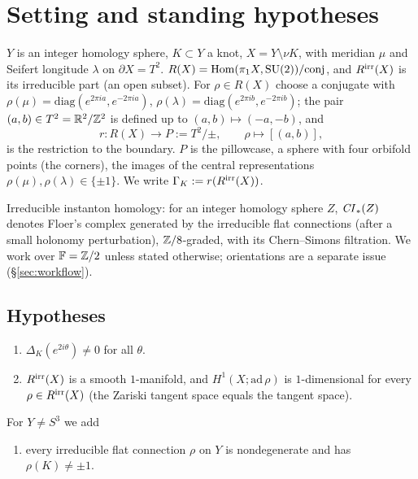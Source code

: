 \section{Setting and standing hypotheses}\label{sec:setting}
$Y$ is an integer homology sphere, $K\subset Y$ a knot, $X=Y\setminus\nu K$, with meridian $\mu$ and
Seifert longitude $\lambda$ on $\partial X=T^2$.  $R(X)=\operatorname{Hom}(\pi_1X,\operatorname{SU}(2))/\mathrm{conj}$, and $R^{\rm irr}(X)$ is
its irreducible part (an open subset).  For $\rho\in R(X)$ choose a conjugate with
$\rho(\mu)=\mathrm{diag}(e^{2\pi ia},e^{-2\pi ia})$, $\rho(\lambda)=\mathrm{diag}(e^{2\pi ib},e^{-2\pi ib})$; the pair
$(a,b)\in T^2=\mathbb{R}^2/\mathbb{Z}^2$ is defined up to $(a,b)\mapsto(-a,-b)$, and
\[
r\colon R(X)\to P:=T^2/\pm,\qquad \rho\mapsto[(a,b)],
\]
is the restriction to the boundary.  $P$ is the pillowcase, a sphere with four orbifold points (the corners),
the images of the central representations $\rho(\mu),\rho(\lambda)\in\{\pm1\}$.  We write $\Gamma_K:=r(R^{\rm irr}(X))$.

Irreducible instanton homology: for an integer homology sphere $Z$, $\mathit{CI}_*(Z)$ denotes Floer's complex generated by
the irreducible flat connections (after a small holonomy perturbation), $\mathbb{Z}/8$-graded, with its Chern--Simons
filtration.  We work over $\mathbb{F}=\mathbb{Z}/2$ unless stated otherwise; orientations are a separate issue (\S\ref{sec:workflow}).

\subsection{Hypotheses}
\begin{enumerate}[label=(H\arabic*),leftmargin=2.6em]
\item\label{H:alex} $\Delta_K(e^{2i\theta})\neq0$ for all $\theta$.
\item\label{H:smooth} $R^{\rm irr}(X)$ is a smooth $1$-manifold, and $H^1(X;\mathrm{ad}\,\rho)$ is $1$-dimensional for every
$\rho\in R^{\rm irr}(X)$ (the Zariski tangent space equals the tangent space).
\end{enumerate}
For $Y\ne S^3$ we add
\begin{enumerate}[label=(H\arabic*),leftmargin=2.6em,resume]
\item\label{H:Y} every irreducible flat connection $\rho$ on $Y$ is nondegenerate and has $\rho(K)\ne\pm1$.
\end{enumerate}

